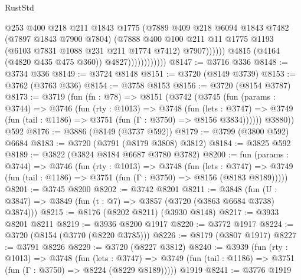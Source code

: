\begin{lexlean}{RustStd}
\begin{coremodule}
                                    @253
                                    @400
                                    @218
                                    @211
                                    @1843
                                    @1775
                                    (@7889
                                      @409
                                      @218
                                      @6094
                                      @1843
                                      @7482
                                      (@7897 @1843 @7900 @7804)
                                      (@7888
                                        @400
                                        @100
                                        @211
                                        @11
                                        @1775
                                        @1193
                                        (@6103 @7831 @1088 @231 @211 @1774 @7412)
                                        @7907))))))
                            @4815
                            (@4164 (@4820 @435 @475 @360))
                            @4827))))))))))))
@8147 := @3716 @336
@8148 := @3734 @336
@8149 := @3724 @8148
@8151 := @3720 (@8149 @3739)
@8153 := @3762 (@3763 @336)
@8154 := @3758 @8153
@8156 := @3720 (@8154 @3787)
@8173 := @3719
    (fun (fn : @78) =>
    @8151
      (@3742
        (@3745
          (fun (params : @3744) =>
          @3746
            (fun (rty : @1013) =>
            @3748
              (fun (lets : @3747) =>
              @3749 (fun (tail : @1186) => @3751 (fun (Γ : @3750) => @8156 @3834))))))
        @3880))
    @592
@8176 := @3886 (@8149 (@3737 @592))
@8179 := @3799 (@3800 @592) @6684
@8183 := @3720 (@3791 (@8179 @3808) @3812)
@8184 := @3825 @592
@8189 := @3822 (@3824 @8184 @6687 @3780 @3782)
@8200 := fun (params : @3744) =>
  @3746
    (fun (rty : @1013) =>
    @3748
      (fun (lets : @3747) =>
      @3749 (fun (tail : @1186) => @3751 (fun (Γ : @3750) => @8156 (@8183 @8189)))))
@8201 := @3745 @8200
@8202 := @3742 @8201
@8211 := @3848 (fun (U : @3847) => @3849 (fun (t : @7) => @3857 (@3720 (@3863 @6684 @3738) @3874)))
@8215 := @8176 (@8202 @8211) (@3930 @8148)
@8217 := @3933 @8201 @8211
@8219 := @3936 @8200 @1917
@8220 := @3772 @1917
@8224 := @3720 (@8154 (@3770 (@8220 @3785)))
@8226 := @8179 (@3807 @1917)
@8227 := @3791 @8226
@8229 := @3720 (@8227 @3812)
@8240 := @3939
    (fun (rty : @1013) =>
    @3748
      (fun (lets : @3747) =>
      @3749 (fun (tail : @1186) => @3751 (fun (Γ : @3750) => @8224 (@8229 @8189)))))
    @1919
@8241 := @3776 @1919

\end{coremodule}
\end{lexlean}
